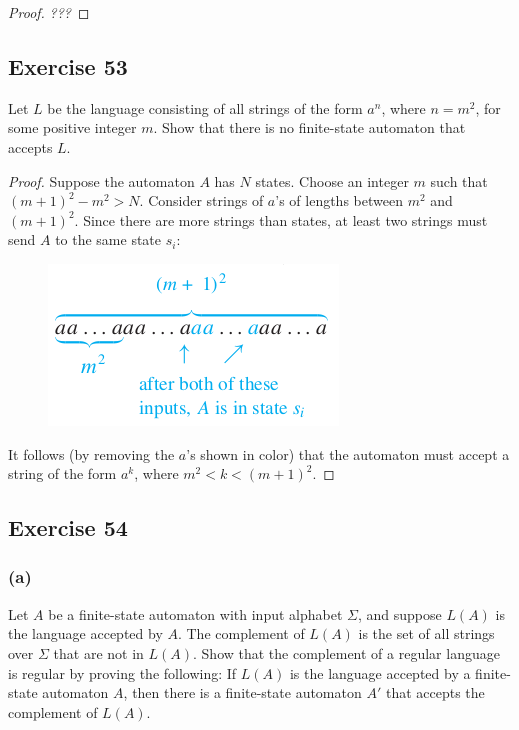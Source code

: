 \documentclass[14pt]{extarticle}
\begin{document}
\begin{proof}
{\it ???}
\end{proof}

\subsection{Exercise 53}
Let \(L\) be the language consisting of all strings of the form \(a^n\), where \(n = m^2\), for some positive integer 
\(m\). Show that there is no finite-state automaton that accepts \(L\).

\begin{proof}
Suppose the automaton \(A\) has \(N\) states. Choose an integer \(m\) such that \((m + 1)^2 - m^2 > N\). Consider 
strings of \(a\)’s of lengths between \(m^2\) and \((m + 1)^2\). Since there are more strings than states, at least two 
strings must send \(A\) to the same state \(s_i\):

\begin{figure}[ht!]
\centering
\includegraphics[scale=0.5]{../images/12.2.53.png}
\end{figure}

It follows (by removing the \(a\)’s shown in color) that the automaton must accept a string of the form \(a^k\), where 
\(m^2 < k < (m + 1)^2\).
\end{proof}

\subsection{Exercise 54}
\subsubsection{(a)}
Let \(A\) be a finite-state automaton with input alphabet \(\Sigma\), and suppose \(L(A)\) is the language accepted by 
\(A\). The complement of \(L(A)\) is the set of all strings over \(\Sigma\) that are not in \(L(A)\). Show that the 
complement of a regular language is regular by proving the following: If \(L(A)\) is the language accepted by a 
finite-state automaton \(A\), then there is a finite-state automaton \(A'\) that accepts the complement of \(L(A)\).
\end{document}
